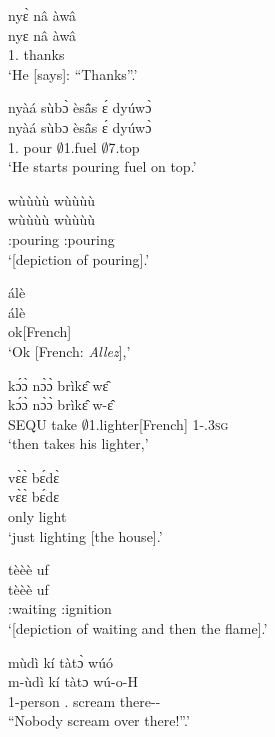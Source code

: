 \begin{exe}[(N234)]
\exN\label{n166}
  \glll nyɛ̀ nâ àwâ \\
     nyɛ nâ àwâ \\
       1.{\SBJ}  {\COMP} thanks  \\
    \trans `He [says]: ``Thanks''.'
 
\exN\label{n167}
  \glll nyàá sùbɔ̀ èsã̂s ɛ́ dyúwɔ̀ \\
        nyàá sùbɔ èsã̂s ɛ́ dyúwɔ̀ \\
       1.{\INCH} pour $\emptyset$1.fuel {\LOC} $\emptyset$7.top  \\
    \trans `He starts pouring fuel on top.'
 
\exN\label{n168}
  \glll wùùùù wùùùù \\
      wùùùù wùùùù \\
        {\IDEO}:pouring {\IDEO}:pouring \\
    \trans `[depiction of pouring].'
 
\exN\label{n169}
  \glll álè  \\
       álè  \\
        ok[French] \\
    \trans `Ok [French: {\itshape Allez}],'
 
\exN\label{n170}
  \glll kɔ́ɔ̀ nɔ̀ɔ̀ brìkɛ̂ wɛ̂ \\
        kɔ́ɔ̀ nɔ̀ɔ̀ brìkɛ̂ w-ɛ̂ \\
      SEQU  take $\emptyset$1.lighter[French] 1-{\POSS}.3\textsc{sg} \\
    \trans `then takes his lighter,'
 
\exN\label{n171}
  \glll vɛ̀ɛ̀ bɛ́dɛ̀ \\
       vɛ̀ɛ̀ bɛ́dɛ \\
       only light  \\
    \trans `just lighting [the house].'
 
\exN\label{n172}
  \glll tèèè uf \\
       tèèè uf \\
       {\IDEO}:waiting {\IDEO}:ignition  \\
    \trans `[depiction of waiting and then the flame].'
 
\exN\label{n173} 
  \glll mùdì kí tàtɔ̀ wúó \\
       m-ùdì kí tàtɔ wú-o-H \\
        {\N}1-person {\NEG}.{\IMP}  scream there-{\VOC}-{\DIST} \\
    \trans ``Nobody scream over there!''.'
 

\end{exe}
